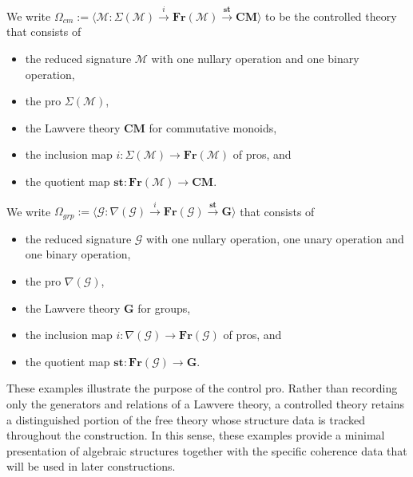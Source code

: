 \documentclass{tac}
\begin{document}
\begin{example}\label{cont_theory_for_sym_mon_gpds} We write $\Omega_{cm}:=\langle \mathcal{M}:\Sigma(\mathcal{M})\xrightarrow{i}\mathbf{Fr}(\mathcal{M})\xrightarrow{\mathbf{st}}\mathbf{CM}\rangle$ to be the controlled theory that consists of
\begin{itemize}
\item  the reduced signature $\mathcal{M}$ with one nullary operation and one binary operation,
\item the pro $\Sigma(\mathcal{M})$,
\item the Lawvere theory $\mathbf{CM}$ for commutative monoids,
\item the inclusion map $i:\Sigma(\mathcal{M})\to \mathbf{Fr}(\mathcal{M})$ of pros, and
\item the quotient map $\mathbf{st}:\mathbf{Fr}(\mathcal{M})\to\mathbf{CM}$.
\end{itemize}
\end{example}

\begin{example}\label{cont_theory_for_2_grps} We write $\Omega_{grp}:=\langle \mathcal{G}:\nabla(\mathcal{G})\xrightarrow{i}\mathbf{Fr}(\mathcal{G})\xrightarrow{\mathbf{st}}\mathbf{G}\rangle$ that consists of
  \begin{itemize}
 	\item  the reduced signature $\mathcal{G}$ with one nullary operation, one unary operation and one binary operation,
 	\item the pro $\nabla(\mathcal{G})$,
 	\item the Lawvere theory $\mathbf{G}$ for groups,
 	\item the inclusion map $i:\nabla(\mathcal{G})\to \mathbf{Fr}(\mathcal{G})$ of pros, and
 	\item the quotient map $\mathbf{st}:\mathbf{Fr}(\mathcal{G})\to\mathbf{G}$.
 \end{itemize}
\end{example}

These examples illustrate the purpose of the control pro. Rather than recording
only the generators and relations of a Lawvere theory, a controlled theory
retains a distinguished portion of the free theory whose structure data is
tracked throughout the construction. In this sense, these examples provide
a minimal presentation of algebraic structures together with the specific
coherence data that will be used in later constructions.
\end{document}
